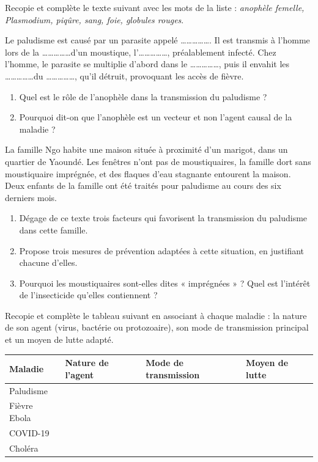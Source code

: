 \documentclass[11pt]{article}
\newcommand{\cle}[1]{{\popxbold\color{popdark}#1}}
\begin{document}
\begin{exercice}
Recopie et complète le texte suivant avec les mots de la liste : \emph{anophèle femelle, Plasmodium, piqûre, sang, foie, globules rouges}.

Le paludisme est causé par un parasite appelé \ldots\ldots\ldots\ldots\ldots. Il est transmis à l'homme lors de la \ldots\ldots\ldots\ldots\ldots d'un moustique, l'\ldots\ldots\ldots\ldots\ldots, préalablement infecté. Chez l'homme, le parasite se multiplie d'abord dans le \ldots\ldots\ldots\ldots\ldots, puis il envahit les \ldots\ldots\ldots\ldots\ldots du \ldots\ldots\ldots\ldots\ldots, qu'il détruit, provoquant les accès de fièvre.
\begin{enumerate}
\item Quel est le rôle de l'anophèle dans la transmission du paludisme ?
\item Pourquoi dit-on que l'anophèle est un \cle{vecteur} et non l'agent causal de la maladie ?
\end{enumerate}
\end{exercice}

\begin{exercice}
La famille Ngo habite une maison située à proximité d'un marigot, dans un quartier de Yaoundé. Les fenêtres n'ont pas de moustiquaires, la famille dort sans moustiquaire imprégnée, et des flaques d'eau stagnante entourent la maison. Deux enfants de la famille ont été traités pour paludisme au cours des six derniers mois.
\begin{enumerate}
\item Dégage de ce texte trois facteurs qui favorisent la transmission du paludisme dans cette famille.
\item Propose trois mesures de prévention adaptées à cette situation, en justifiant chacune d'elles.
\item Pourquoi les moustiquaires sont-elles dites « imprégnées » ? Quel est l'intérêt de l'insecticide qu'elles contiennent ?
\end{enumerate}
\end{exercice}

\begin{exercice}
Recopie et complète le tableau suivant en associant à chaque maladie : la nature de son agent (virus, bactérie ou protozoaire), son mode de transmission principal et un moyen de lutte adapté.

\begin{center}
\begin{tabularx}{\linewidth}{|l|X|X|X|}
\hline
\rowcolor{popblueL} Maladie & Nature de l'agent & Mode de transmission & Moyen de lutte \\
\hline
Paludisme & & & \\
\hline
Fièvre Ebola & & & \\
\hline
COVID-19 & & & \\
\hline
Choléra & & & \\
\hline
\end{tabularx}
\end{center}
\end{exercice}
\end{document}
